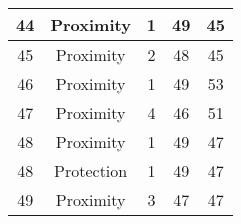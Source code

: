 \documentclass[results.tex]{subfiles}
\begin{document}
\begin{center}
\begin{tabular}{| c || c | c | c | c |}
    \hline
    44 & Proximity & 1 & 49 & 45 \\ 
    \hline
    45 & Proximity & 2 & 48 & 45 \\ 
    \hline
    46 & Proximity & 1 & 49 & 53 \\ 
    \hline
    47 & Proximity & 4 & 46 & 51 \\ 
    \hline
    48 & Proximity & 1 & 49 & 47 \\ 
    \hline
    48 & Protection & 1 & 49 & 47 \\ 
    \hline
    49 & Proximity & 3 & 47 & 47 \\ 
    \hline   \end{tabular}
\end{center}
\end{document}
